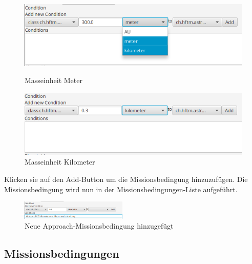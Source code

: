 \begin{figure}[H]
	\centering
	\begin{minipage}[b]{0.45\textwidth}
		\includegraphics[width=\textwidth]{res/conditionunits.png}
		\caption{Masseinheit Meter}
	\end{minipage}
	\hfill
	\begin{minipage}[b]{0.45\textwidth}
		\includegraphics[width=\textwidth]{res/conditionunits2.png}
		\caption{Masseinheit Kilometer}
	\end{minipage}
\end{figure}

Klicken sie auf den Add-Button um die Missionsbedingung hinzuzufügen.
Die Missionsbedingung wird nun in der Missionsbedingungen-Liste aufgeführt.

\begin{figure}[H]
	\centering
	\includegraphics[width=0.45\textwidth]{res/conditionadded.png}
	\caption{Neue Approach-Missionsbedingung hinzugefügt}
\end{figure}

\hypertarget{conditiontable}{\subsection{Missionsbedingungen}}

